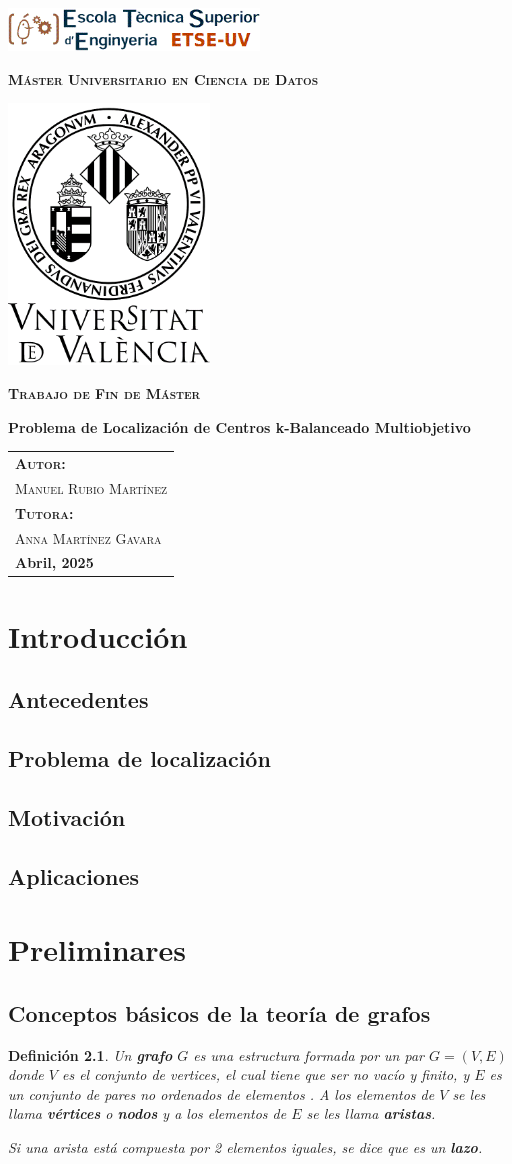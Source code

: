 \documentclass[12pt,a4paper]{book}
\newtheorem{defi}{Definición}[section]
\newcommand{\nuevaportada}[6]{
    \thispagestyle{empty}
    \begin{center}
        \includegraphics[width=0.5\textwidth]{images/logo.png}
        
        \vspace{0.5cm}
        {\Large\bfseries\textsc{M\'aster Universitario en #1}\par}
        
        \vspace{0.5cm}
        \includegraphics[width=0.4\textwidth]{images/uv.png}
        
        \vspace{0.5cm}
        {\Large\bfseries\textsc{Trabajo de Fin de M\'aster}\par}
        
        \vspace{0.5cm}
        {\Large\bfseries #2\par}
        
        \vspace{2cm}
        \begin{flushright}
            \begin{tabular}{l} 
                {\large\bfseries\textsc{Autor:}} \\
                {\large\textsc{#3}} \\ [0.5cm] 
                {\large\bfseries\textsc{Tutora:}} \\ 
                {\large\textsc{#4}} \\ [0.5cm]
                {\large\bfseries #5} 
            \end{tabular}
        \end{flushright}
    \end{center}
    \clearpage
}
\begin{document}
\frontmatter
{}
\nuevaportada{Ciencia de Datos}{Problema de Localización de Centros k-Balanceado Multiobjetivo}{Manuel Rubio Martínez}{Anna Martínez Gavara}{Abril, 2025}

\clearpage
\thispagestyle{empty} \mbox{} \clearpage

\newpage
\tableofcontents

\chapter{Introducción}

\section{Antecedentes}

\section{Problema de localización}

\section{Motivación}

\section{Aplicaciones}


\chapter{Preliminares}
\section{Conceptos básicos de la teoría de grafos}

\begin{defi}
Un \textbf{grafo} $G$ es una estructura formada por un par $G=(V,E)$ donde $V$ es el conjunto de vertices, el cual
tiene que ser no vacío y finito, y $E$ es un conjunto de pares no ordenados de elementos . A los elementos
de $V$ se les llama \textbf{vértices} o \textbf{nodos} y a los elementos de $E$ se les llama \textbf{aristas}.

\smallskip

Si una arista está compuesta por 2 elementos iguales, se dice que es un \textbf{lazo}.

\end{defi}
\bigskip
\end{document}
